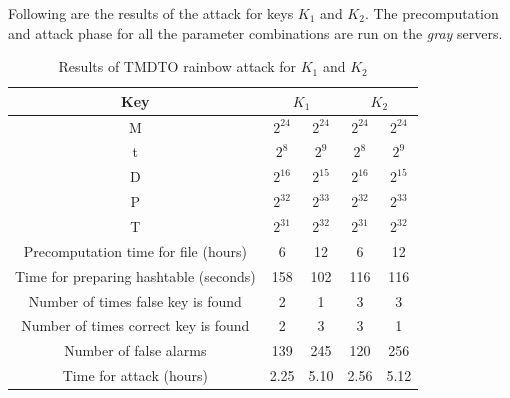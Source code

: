 Following are the results of the attack for keys $K_1$ and $K_2$. The precomputation and attack phase for all the parameter combinations are run on the \textit{gray} servers.

\begin{table}[ht!]
\begin{center}
\begin{tabular}{|c||c|c||c|c|}
\hline
Key & \multicolumn{2}{c||}{\textbf{$K_1$}} & \multicolumn{2}{c|}{\textbf{$K_2$}} \\ \hline \hline
M																				&	$2^{24}$ 	&	$2^{24}$ 	&	$2^{24}$ 	&	$2^{24}$ 	\\ 
t	  																		&	$2^{8}$ 	&	$2^{9}$ 	&	$2^{8}$ 	&	$2^{9}$		\\ 
D	  																		&	$2^{16}$ 	&	$2^{15}$ 	&	$2^{16}$ 	&	$2^{15}$	\\ \hline \hline
P	  																		&	$2^{32}$ 	&	$2^{33}$ 	&	$2^{32}$ 	&	$2^{33}$	\\ 
T	  																		&	$2^{31}$ 	&	$2^{32}$ 	&	$2^{31}$ 	&	$2^{32}$	\\ \hline \hline
Precomputation time for file (hours)		&	6 	 			&	12 				&	6					&	12 				\\ \hline
Time for preparing hashtable (seconds)	&	158				&	102				& 116				&	116				\\ \hline
Number of times false key is found			&	2 				&	1 				&	3 				&	3 				\\ \hline
Number of times correct key is found 		&	2 				&	3					&	3 				&	1 				\\ \hline
Number of false alarms									&	139				&	245				&	120				&	256				\\ \hline
Time for attack	(hours)									&	2.25 			&	5.10			&	2.56 		 	&	5.12 			\\ \hline
\end{tabular}
\end{center}
\caption{Results of TMDTO rainbow attack for $K_1$ and $K_2$}
\label{tab:rainbow-attack-results}
\end{table}

